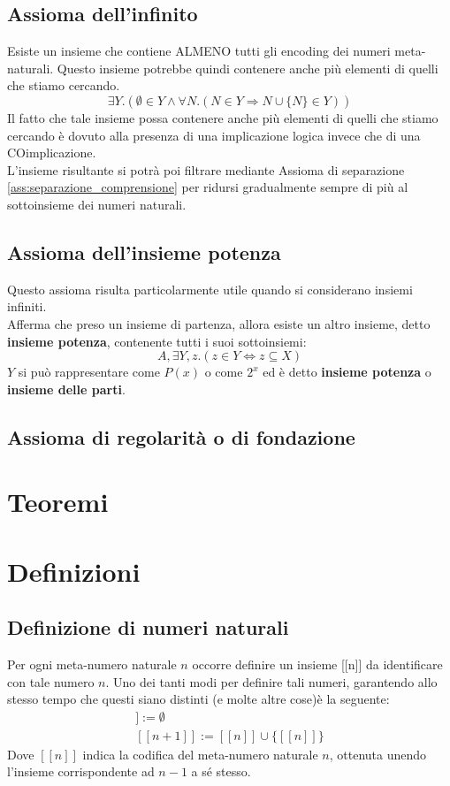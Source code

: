 \documentclass[12pt]{article}
\begin{document}
\subsection{Assioma dell'infinito}
Esiste un insieme che contiene ALMENO tutti gli encoding dei numeri meta-naturali. Questo insieme potrebbe quindi contenere anche più elementi di quelli che stiamo cercando.
\begin{equation}
    \exists Y.(\emptyset \in Y \wedge \forall N. (N \in Y \Rightarrow N \cup \{N\} \in Y)) \label{ass:infinito} \tag{ax. 6}
\end{equation}
Il fatto che tale insieme possa contenere anche più elementi di quelli che stiamo cercando è dovuto alla presenza di una implicazione logica invece che di una COimplicazione.\\
L'insieme risultante si potrà poi filtrare mediante Assioma di separazione \eqref{ass:separazione_comprensione} per ridursi gradualmente sempre di più al sottoinsieme dei numeri naturali.
\subsection{Assioma dell'insieme potenza}
Questo assioma risulta particolarmente utile quando si considerano insiemi infiniti.\\
Afferma che preso un insieme di partenza, allora esiste un altro insieme, detto \textbf{insieme potenza}, contenente tutti i suoi sottoinsiemi:
\begin{equation}
    A, \exists Y, z.(z \in Y \Leftrightarrow z \subseteq X) \label{ass:insieme_potenza} \tag{ax. 7}
\end{equation}
$Y$ si può rappresentare come $P(x)$ o come $2^x$ ed è detto \textbf{insieme potenza} o \textbf{insieme delle parti}.
\subsection{Assioma di regolarità o di fondazione}

\section{Teoremi}
\section{Definizioni}
\subsection{Definizione di numeri naturali} \label{subsec:def:numeri_naturali}
Per ogni meta-numero naturale $n$ occorre definire un insieme [[n]] da identificare con tale numero $n$.
Uno dei tanti modi per definire tali numeri, garantendo allo stesso tempo che questi siano distinti (e molte altre cose)è la seguente:
\begin{gather*}
    [[0]] := \emptyset\\
    [[n + 1]] := [[n]] \cup \{[[n]]\}
\end{gather*}
Dove $[[n]]$ indica la codifica del meta-numero naturale $n$, ottenuta unendo l'insieme corrispondente ad $n-1$ a sé stesso.
\end{document}

